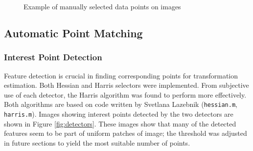 \documentclass[a4paper, 10pt, conference]{ieeeconf}
\begin{document}
\begin{figure}[!ht]
	\caption{Example of manually selected data points on images}
    \vspace{-0.75cm}
  \label{fig:manual}
\end{figure}

\subsection{Automatic Point Matching }
\subsubsection{Interest Point Detection}

Feature detection is crucial in finding corresponding points for transformation estimation. Both Hessian and Harris selectors were implemented. From subjective use of each detector, the Harris algorithm was found to perform more effectively. Both algorithms are based on code written by Svetlana Lazebnik \cite{harrisdetector} (\texttt{hessian.m}, \texttt{harris.m}). Images showing interest points detected by the two detectors are shown in Figure \ref{fig:detectors}. These images show that many of the detected features seem to be part of uniform patches of image; the threshold was adjusted in future sections to yield the most suitable number of points.
\end{document}
